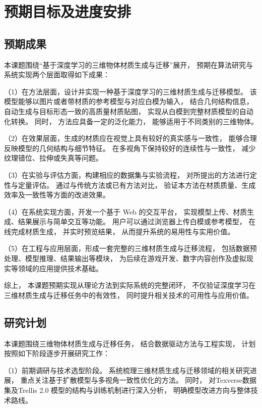 \section{预期目标及进度安排}

\subsection{预期成果}
本课题围绕“基于深度学习的三维物体材质生成与迁移”展开，  
预期在算法研究与系统实现两个层面取得如下成果：  

（1）在方法层面，设计并实现一种基于深度学习的三维材质生成与迁移模型。  
该模型能够以图片或者带材质的参考模型与对应白模为输入，  
结合几何结构信息，  
自动生成与目标形态一致的高质量材质贴图，  
实现从白模到完整材质模型的自动化转换。  
同时，  
方法应具备一定的泛化能力，  
能够适用于不同类别的三维物体。  

（2）在效果层面，生成的材质应在视觉上具有较好的真实感与一致性，  
能够合理反映模型的几何结构与细节特征。  
在多视角下保持较好的连续性与一致性，  
减少纹理错位、拉伸或失真等问题。  

（3）在实验与评估方面，构建相应的数据集与实验流程，  
对所提出的方法进行定性与定量评估。  
通过与传统方法或已有方法对比，  
验证本方法在材质质量、生成效率及一致性等方面的改进效果。  

（4）在系统实现方面，开发一个基于 Web 的交互平台，  
实现模型上传、材质生成、结果展示与简单交互等功能。  
用户可以通过浏览器上传白模或参考模型，  
在线完成材质生成，  
并实时预览结果，  
从而提升系统的易用性与实用价值。  

（5）在工程与应用层面，形成一套完整的三维材质生成与迁移流程，  
包括数据预处理、模型推理、结果输出等模块，  
为后续在游戏开发、数字内容创作及虚拟现实等领域的应用提供技术基础。  

综上，  
本课题预期实现从理论方法到实际系统的完整闭环，  
不仅验证深度学习在三维材质生成与迁移任务中的有效性，  
同时提升相关技术的可用性与应用价值。  
\subsection{研究计划}

本课题围绕三维物体材质生成与迁移任务，  
结合数据驱动方法与工程实现，  
计划按照如下阶段逐步开展研究工作：  

（1）前期调研与技术选型阶段。  
系统梳理三维材质生成与迁移领域的相关研究进展，  
重点关注基于扩散模型与多视角一致性优化的方法。  
同时，  
对Texverse数据集\cite{zhang2025texverse}及Trellis 2.0 \cite{xiang2025native}模型的结构与训练机制进行深入分析，  
明确模型改进方向与整体技术路线。  

